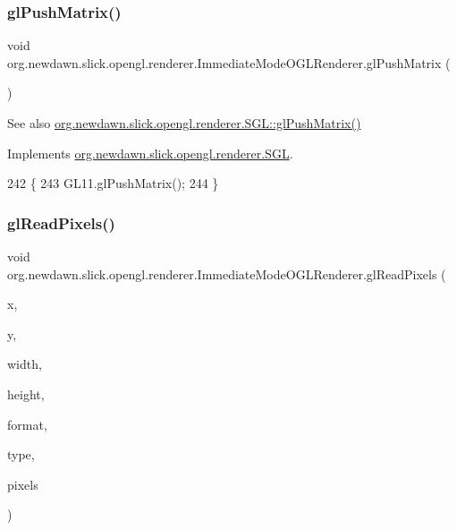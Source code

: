 \subsubsection{\texorpdfstring{gl\+Push\+Matrix()}{glPushMatrix()}}
{\footnotesize\ttfamily void org.\+newdawn.\+slick.\+opengl.\+renderer.\+Immediate\+Mode\+O\+G\+L\+Renderer.\+gl\+Push\+Matrix (\begin{DoxyParamCaption}{ }\end{DoxyParamCaption})\hspace{0.3cm}{\ttfamily [inline]}}

\begin{DoxySeeAlso}{See also}
\mbox{\hyperlink{interfaceorg_1_1newdawn_1_1slick_1_1opengl_1_1renderer_1_1_s_g_l_ae9904a980aa014796bf1dcd748b63056}{org.\+newdawn.\+slick.\+opengl.\+renderer.\+S\+G\+L\+::gl\+Push\+Matrix()}} 
\end{DoxySeeAlso}


Implements \mbox{\hyperlink{interfaceorg_1_1newdawn_1_1slick_1_1opengl_1_1renderer_1_1_s_g_l_ae9904a980aa014796bf1dcd748b63056}{org.\+newdawn.\+slick.\+opengl.\+renderer.\+S\+GL}}.


\begin{DoxyCode}
242                                \{
243         GL11.glPushMatrix();
244     \}
\end{DoxyCode}
\mbox{\label{classorg_1_1newdawn_1_1slick_1_1opengl_1_1renderer_1_1_immediate_mode_o_g_l_renderer_a7326fdbf7c8cbb6b63fb61f9b5693087}} 
\subsubsection{\texorpdfstring{gl\+Read\+Pixels()}{glReadPixels()}}
{\footnotesize\ttfamily void org.\+newdawn.\+slick.\+opengl.\+renderer.\+Immediate\+Mode\+O\+G\+L\+Renderer.\+gl\+Read\+Pixels (\begin{DoxyParamCaption}\item[{int}]{x,  }\item[{int}]{y,  }\item[{int}]{width,  }\item[{int}]{height,  }\item[{int}]{format,  }\item[{int}]{type,  }\item[{Byte\+Buffer}]{pixels }\end{DoxyParamCaption})\hspace{0.3cm}{\ttfamily [inline]}}

